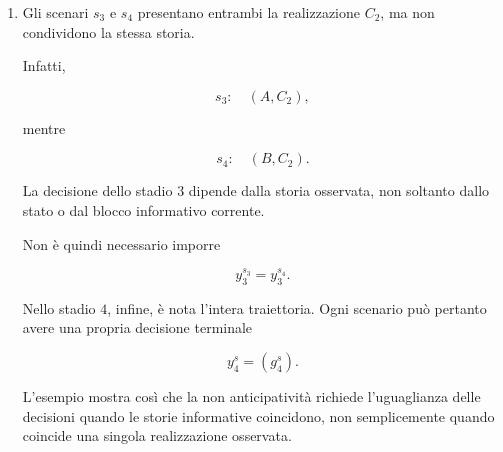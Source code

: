 \begin{enumerate}
\[
u_1^{s_1}=2,
\qquad
u_1^{s_2}=1,
\qquad
u_1^{s_3}=2.
\]

Al tempo $1$, la banca non dispone
ancora dell'informazione necessaria
per distinguere lo scenario $s_2$
dagli scenari $s_1$ e $s_3$.

Una correzione coerente con il piano
assegnato consiste quindi nel porre

\[
u_1^{s_2}=2.
\]

Per il secondo blocco di ricorso, si ha invece

\[
y_3^{s_1}
=
\begin{pmatrix}
2\\
1\\
3\\
0
\end{pmatrix}
=
y_3^{s_2},
\]

per cui il vincolo di non anticipativit\`a
dello stadio $3$ \`e rispettato.

La correzione proposta garantisce
la sola coerenza informativa.
La fattibilit\`a finanziaria completa
richiederebbe anche la verifica
dei bilanci di liquidit\`a.

\item Gli scenari $s_3$ e $s_4$
presentano entrambi la realizzazione $C_2$,
ma non condividono la stessa storia.

Infatti,

\[
s_3:\quad (A,C_2),
\]

mentre

\[
s_4:\quad (B,C_2).
\]

La decisione dello stadio $3$
dipende dalla storia osservata,
non soltanto dallo stato
o dal blocco informativo corrente.

Non \`e quindi necessario imporre

\[
y_3^{s_3}=y_3^{s_4}.
\]

Nello stadio $4$, infine,
\`e nota l'intera traiettoria.
Ogni scenario pu\`o pertanto
avere una propria decisione terminale

\[
y_4^s=(g_4^s).
\]

L'esempio mostra cos\`i che
la non anticipativit\`a richiede
l'uguaglianza delle decisioni
quando le storie informative coincidono,
non semplicemente quando coincide
una singola realizzazione osservata.

\end{enumerate}


